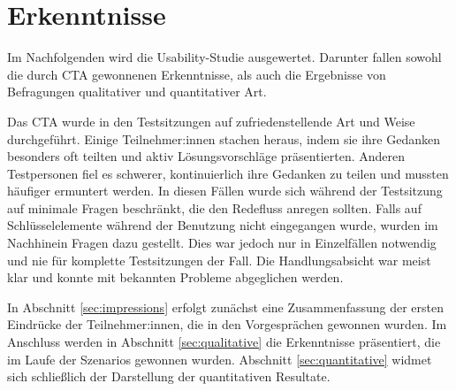 \section{Erkenntnisse}

Im Nachfolgenden wird die Usability-Studie ausgewertet. Darunter fallen sowohl die durch \acs{CTA} gewonnenen Erkenntnisse, als auch die Ergebnisse von Befragungen qualitativer und quantitativer Art.

Das \ac{CTA} wurde in den Testsitzungen auf zufriedenstellende Art und Weise durchgeführt. Einige Teilnehmer:innen stachen heraus, indem sie ihre Gedanken besonders oft teilten und aktiv Lösungsvorschläge präsentierten. Anderen Testpersonen fiel es schwerer, kontinuierlich ihre Gedanken zu teilen und mussten häufiger ermuntert werden. In diesen Fällen wurde sich während der Testsitzung auf minimale Fragen beschränkt, die den Redefluss anregen sollten. Falls auf Schlüsselelemente während der Benutzung nicht eingegangen wurde, wurden im Nachhinein Fragen dazu gestellt. Dies war jedoch nur in Einzelfällen notwendig und nie für komplette Testsitzungen der Fall. Die Handlungsabsicht war meist klar und konnte mit bekannten Probleme abgeglichen werden.

In Abschnitt \ref{sec:impressions} erfolgt zunächst eine Zusammenfassung der ersten Eindrücke der Teilnehmer:innen, die in den Vorgesprächen gewonnen wurden. Im Anschluss werden in Abschnitt \ref{sec:qualitative} die Erkenntnisse präsentiert, die im Laufe der Szenarios gewonnen wurden. Abschnitt \ref{sec:quantitative} widmet sich schließlich der Darstellung der quantitativen Resultate.
